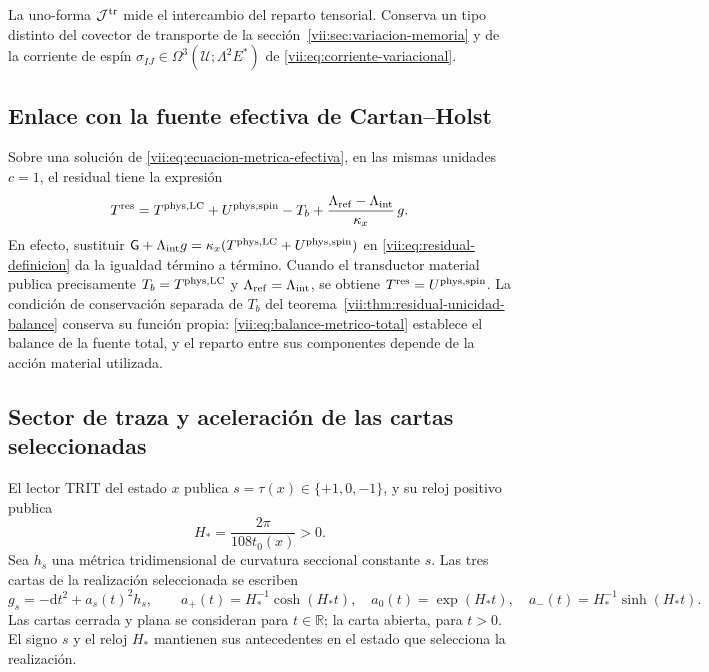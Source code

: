 La uno-forma \(\mathcal J^{\rm tr}\) mide el intercambio del reparto
tensorial. Conserva un tipo distinto del covector de transporte de la
sección~\ref{vii:sec:variacion-memoria} y de la corriente de espín
\(\sigma_{IJ}\in\Omega^3(\mathcal U;\Lambda^2E^*)\) de
\eqref{vii:eq:corriente-variacional}.

\subsection{Enlace con la fuente efectiva de Cartan--Holst}
\label{vii:subsec:residual-fuente-cartan}

Sobre una solución de \eqref{vii:eq:ecuacion-metrica-efectiva}, en las
mismas unidades \(c=1\), el residual tiene la expresión
\begin{equation}
 T^{\rm res}
 =T^{\rm phys,LC}+U^{\rm phys,spin}-T_b
   +\frac{\Lambda_{\rm ref}-\Lambda_{\rm int}}{\kappa_x}\,g.
 \label{vii:eq:residual-composicion-cartan}
\end{equation}
En efecto, sustituir
\(\mathsf G+\Lambda_{\rm int}g
  =\kappa_x(T^{\rm phys,LC}+U^{\rm phys,spin})\)
en \eqref{vii:eq:residual-definicion} da la igualdad término a término.
Cuando el transductor material publica precisamente
\(T_b=T^{\rm phys,LC}\) y \(\Lambda_{\rm ref}=\Lambda_{\rm int}\),
se obtiene \(T^{\rm res}=U^{\rm phys,spin}\).
La condición de conservación separada de \(T_b\) del
teorema~\ref{vii:thm:residual-unicidad-balance} conserva su función
propia: \eqref{vii:eq:balance-metrico-total} establece el balance de la
fuente total, y el reparto entre sus componentes depende de la acción
material utilizada.

\subsection{Sector de traza y aceleración de las cartas seleccionadas}
\label{vii:subsec:residual-aceleracion-ds}

El lector TRIT del estado \(x\) publica \(s=\tau(x)\in\{+1,0,-1\}\),
y su reloj positivo publica
\begin{equation}
 H_*=\frac{2\pi}{108t_0(x)}>0.
 \label{vii:eq:reloj-carta-ds}
\end{equation}
Sea \(h_s\) una métrica tridimensional de curvatura seccional constante
\(s\). Las tres cartas de la realización seleccionada se escriben
\begin{equation}
 g_s=-\mathrm dt^2+a_s(t)^2h_s,\qquad
 a_+(t)=H_*^{-1}\cosh(H_*t),\quad
 a_0(t)=\exp(H_*t),\quad
 a_-(t)=H_*^{-1}\sinh(H_*t).
 \label{vii:eq:cartas-ds-residual}
\end{equation}
Las cartas cerrada y plana se consideran para \(t\in\mathbb R\);
la carta abierta, para \(t>0\). El signo \(s\) y el reloj \(H_*\)
mantienen sus antecedentes en el estado que selecciona la realización.

